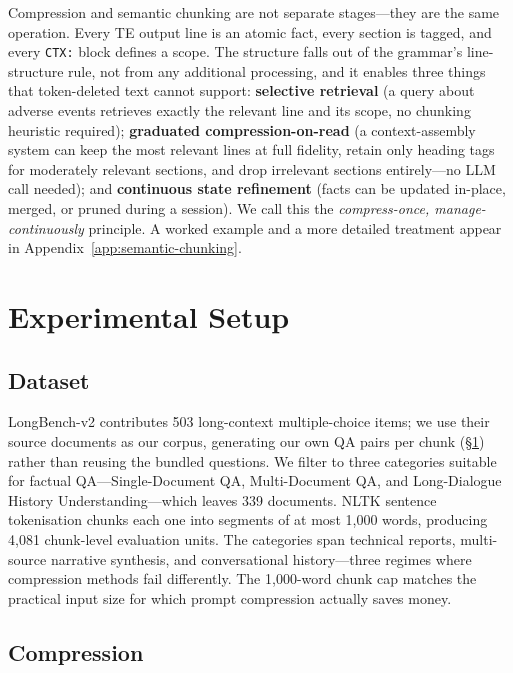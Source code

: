 \documentclass{article}
\begin{document}
Compression and semantic chunking are not separate stages---they are the same operation. Every TE output line is an atomic fact, every section is tagged, and every \texttt{CTX:} block defines a scope. The structure falls out of the grammar's line-structure rule, not from any additional processing, and it enables three things that token-deleted text cannot support: \textbf{selective retrieval} (a query about adverse events retrieves exactly the relevant line and its scope, no chunking heuristic required); \textbf{graduated compression-on-read} (a context-assembly system can keep the most relevant lines at full fidelity, retain only heading tags for moderately relevant sections, and drop irrelevant sections entirely---no LLM call needed); and \textbf{continuous state refinement} (facts can be updated in-place, merged, or pruned during a session). We call this the \emph{compress-once, manage-continuously} principle. A worked example and a more detailed treatment appear in Appendix~\ref{app:semantic-chunking}.

\section{Experimental Setup}
\label{sec:setup}

\subsection{Dataset}

LongBench-v2 \citep{bai2024longbench} contributes 503 long-context multiple-choice items; we use their source documents as our corpus, generating our own QA pairs per chunk (\S\ref{sec:setup}) rather than reusing the bundled questions. We filter to three categories suitable for factual QA---Single-Document QA, Multi-Document QA, and Long-Dialogue History Understanding---which leaves 339 documents. NLTK sentence tokenisation chunks each one into segments of at most 1{,}000 words, producing 4{,}081 chunk-level evaluation units. The categories span technical reports, multi-source narrative synthesis, and conversational history---three regimes where compression methods fail differently. The 1{,}000-word chunk cap matches the practical input size for which prompt compression actually saves money.

\subsection{Compression}
\end{document}

